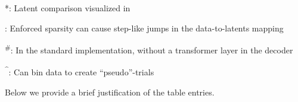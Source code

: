 \begin{table}[h]
\begin{threeparttable}
\begin{tablenotes}[flushleft]
\item **: Latent comparison visualized in 
\item \textsuperscript{\dag}: Enforced sparsity can cause step-like jumps in the data-to-latents mapping
\item \textsuperscript{\#}: In the standard implementation, without a transformer layer in the decoder
\item \textsuperscript{\textasciicircum}: Can bin data to create ``pseudo''-trials
\end{tablenotes}
\end{threeparttable}
\end{table}

\newpage

Below we provide a brief justification of the table entries.

